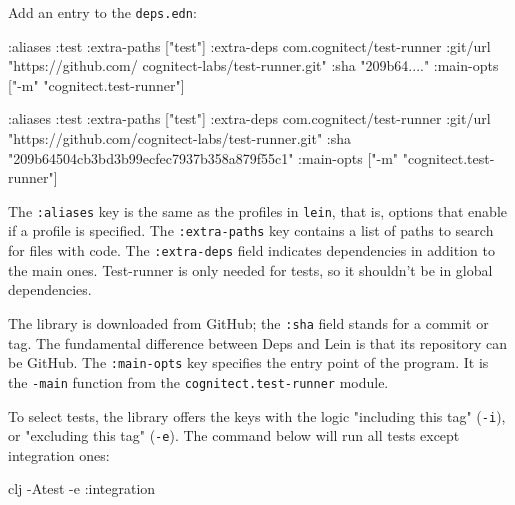Add an entry to the \verb|deps.edn|:

\ifx\DEVICETYPE\MOBILE

\begin{english}
  \begin{clojure}
:aliases
{:test
 {:extra-paths ["test"]
  :extra-deps
  {com.cognitect/test-runner
   {:git/url
    "https://github.com/
         cognitect-labs/test-runner.git"
    :sha "209b64...."}}
  :main-opts
  ["-m" "cognitect.test-runner"]}}
  \end{clojure}
\end{english}

\else

\begin{english}
  \begin{clojure}
:aliases
{:test
 {:extra-paths ["test"]
  :extra-deps
  {com.cognitect/test-runner
   {:git/url "https://github.com/cognitect-labs/test-runner.git"
    :sha "209b64504cb3bd3b99ecfec7937b358a879f55c1"}}
  :main-opts ["-m" "cognitect.test-runner"]}}
  \end{clojure}
\end{english}

\fi


The \verb|:aliases| key is the same as the profiles in \verb|lein|, that is, options that enable if a profile is specified. The \verb|:extra-paths| key contains a list of paths to search for files with code. The \verb|:extra-deps| field indicates dependencies in addition to the main ones. Test-runner is only needed for tests, so it shouldn't be in global dependencies.

The library is downloaded from GitHub; the \verb|:sha| field stands for a commit or tag. The fundamental difference between Deps and Lein is that its repository can be GitHub. The \verb|:main-opts| key specifies the entry point of the program. It is the \verb|-main| function from the \verb|cognitect.test-runner| module.

To select tests, the library offers the keys with the logic "including this tag" (\verb|-i|), or "excluding this tag" (\verb|-e|). The command below will run all tests except integration ones:

\begin{english}
  \begin{bash}
clj -Atest -e :integration
  \end{bash}
\end{english}

